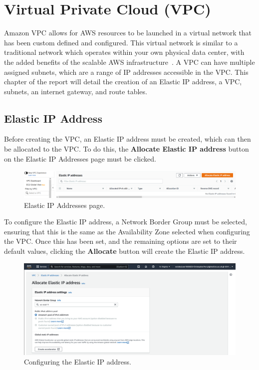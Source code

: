 \chapter{Virtual Private Cloud (VPC)}\label{ch:vpc}

Amazon VPC allows for AWS resources to be launched in a virtual network that has been custom defined and configured.
This virtual network is similar to a traditional network which operates within your own physical data center, with the
added benefits of the scalable AWS infrastructure~\parencite{amazon2022what}.
A VPC can have multiple assigned subnets, which are a range of IP addresses accessible in the VPC\@.
This chapter of the report will detail the creation of an Elastic IP address, a VPC, subnets, an internet gateway, and
route tables.

\section{Elastic IP Address}\label{sec:elastic-ip-address}

Before creating the VPC, an Elastic IP address must be created, which can then be allocated to the VPC\@.
To do this, the \textbf{Allocate Elastic IP address} button on the Elastic IP Addresses page must be clicked.

\begin{figure}[!htbp]
    \centering
    \includegraphics[width=150mm]{resources/vpc/blank_elastic}
    \caption{Elastic IP Addresses page.}
    \label{fig:blank-elastic}
\end{figure}

To configure the Elastic IP address, a Network Border Group must be selected, ensuring that this is the same as the
Availability Zone selected when configuring the VPC\@.
Once this has been set, and the remaining options are set to their default values, clicking the \textbf{Allocate} button
will create the Elastic IP address.

\clearpage
\begin{figure}[!htbp]
    \centering
    \includegraphics[width=150mm]{resources/vpc/vpc_elastic_ip_addresses}
    \caption{Configuring the Elastic IP address.}
    \label{fig:config-elastic}
\end{figure}

